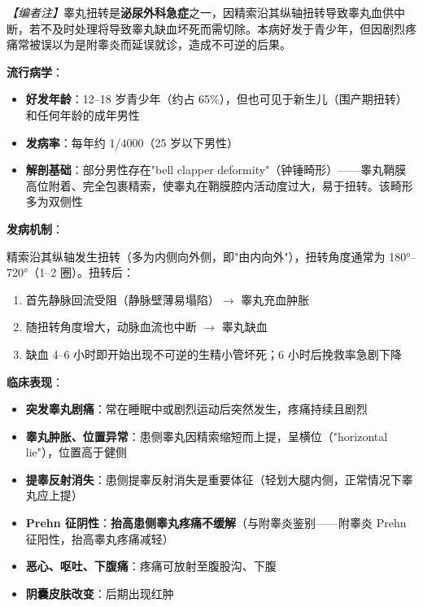 \noindent\textit{【编者注】}睾丸扭转是\textbf{泌尿外科急症}之一，因精索沿其纵轴扭转导致睾丸血供中断，若不及时处理将导致睾丸缺血坏死而需切除。本病好发于青少年，但因剧烈疼痛常被误以为是附睾炎而延误就诊，造成不可逆的后果。

\vspace{0.5em}
\noindent\textbf{流行病学}：
\begin{itemize}[leftmargin=2cm]
	\item \textbf{好发年龄}：12--18 岁青少年（约占 65\%），但也可见于新生儿（围产期扭转）和任何年龄的成年男性
	\item \textbf{发病率}：每年约 1/4000（25 岁以下男性）
	\item \textbf{解剖基础}：部分男性存在"bell clapper deformity"（钟锤畸形）——睾丸鞘膜高位附着、完全包裹精索，使睾丸在鞘膜腔内活动度过大，易于扭转。该畸形多为双侧性
\end{itemize}

\vspace{0.5em}
\noindent\textbf{发病机制}：

精索沿其纵轴发生扭转（多为内侧向外侧，即"由内向外"），扭转角度通常为 180°--720°（1--2 圈）。扭转后：
\begin{enumerate}
	\item 首先静脉回流受阻（静脉壁薄易塌陷）$\rightarrow$ 睾丸充血肿胀
	\item 随扭转角度增大，动脉血流也中断 $\rightarrow$ 睾丸缺血
	\item 缺血 4--6 小时即开始出现不可逆的生精小管坏死；6 小时后挽救率急剧下降
\end{enumerate}

\vspace{0.5em}
\noindent\textbf{临床表现}：
\begin{itemize}[leftmargin=2cm]
	\item \textbf{突发睾丸剧痛}：常在睡眠中或剧烈运动后突然发生，疼痛持续且剧烈
	\item \textbf{睾丸肿胀、位置异常}：患侧睾丸因精索缩短而上提，呈横位（"horizontal lie"），位置高于健侧
	\item \textbf{提睾反射消失}：患侧提睾反射消失是重要体征（轻划大腿内侧，正常情况下睾丸应上提）
	\item \textbf{Prehn 征阴性}：\textbf{抬高患侧睾丸疼痛不缓解}（与附睾炎鉴别——附睾炎 Prehn 征阳性，抬高睾丸疼痛减轻）
	\item \textbf{恶心、呕吐、下腹痛}：疼痛可放射至腹股沟、下腹
	\item \textbf{阴囊皮肤改变}：后期出现红肿
\end{itemize}

